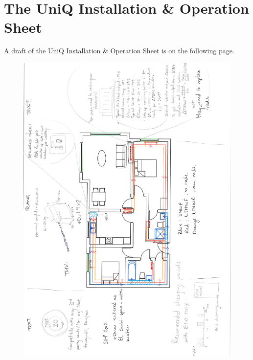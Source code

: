 
\chapter{The UniQ Installation \& Operation Sheet} %

\label{App:ino} %


A draft of the UniQ Installation \& Operation Sheet is on the following page.


\begin{figure}
	\centering
	\includegraphics[height=\textheight]{Appendices/InOSheetSketch.pdf}
\end{figure}